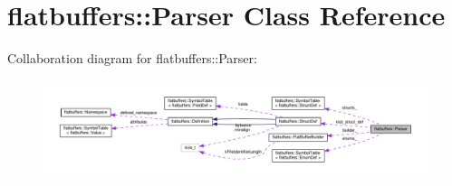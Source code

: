 \hypertarget{classflatbuffers_1_1Parser}{}\section{flatbuffers\+:\+:Parser Class Reference}
\label{classflatbuffers_1_1Parser}


Collaboration diagram for flatbuffers\+:\+:Parser\+:
\nopagebreak
\begin{figure}[H]
\begin{center}
\leavevmode
\includegraphics[width=350pt]{classflatbuffers_1_1Parser__coll__graph}
\end{center}
\end{figure}
